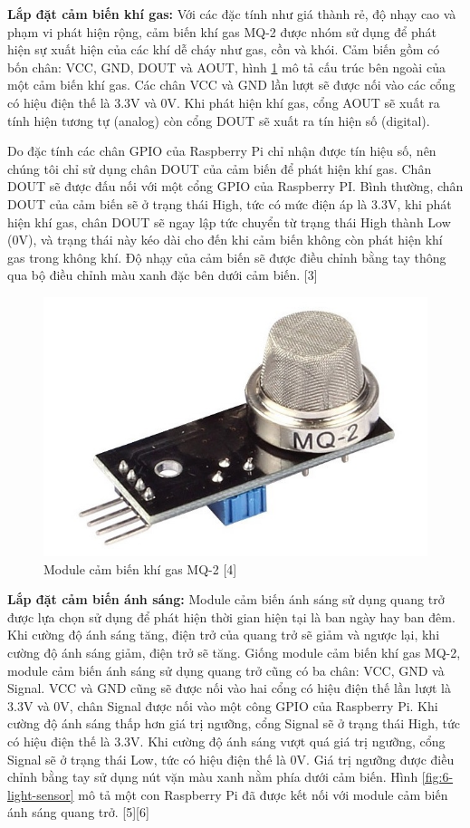 \documentclass[11pt,a4paper,oneside]{book}
\begin{document}
\textbf{Lắp đặt cảm biến khí gas:} Với các đặc tính như giá thành rẻ, độ nhạy cao và phạm vi phát hiện rộng, cảm biến khí gas MQ-2 được nhóm sử dụng để phát hiện sự xuất hiện của các khí dễ cháy như gas, cồn và khói. Cảm biến gồm có bốn chân: VCC, GND, DOUT và AOUT, hình \ref{fig:6-gas-sensor} mô tả cấu trúc bên ngoài của một cảm biến khí gas. Các chân VCC và GND lần lượt sẽ được nối vào các cổng có hiệu điện thế là 3.3V và 0V. Khi phát hiện khí gas, cổng AOUT sẽ xuất ra tính hiện tương tự (analog) còn cổng DOUT sẽ xuất ra tín hiện số (digital).

Do đặc tính các chân GPIO của Raspberry Pi chỉ nhận được tín hiệu số, nên chúng tôi chỉ sử dụng chân DOUT của cảm biến để phát hiện khí gas. Chân DOUT sẽ được đấu nối với một cổng GPIO của Raspberry PI. Bình thường, chân DOUT của cảm biến sẽ ở trạng thái High, tức có mức điện áp là 3.3V, khi phát hiện khí gas, chân DOUT sẽ ngay lập tức chuyển từ trạng thái High thành Low (0V), và trạng thái này kéo dài cho đến khi cảm biến không còn phát hiện khí gas trong không khí. Độ nhạy của cảm biến sẽ được điều chỉnh bằng tay thông qua bộ điều chỉnh màu xanh đặc bên dưới cảm biến. [3]

\begin{figure}[h]
  \centering
     \includegraphics[scale=0.3]{6-gas-sensor}
  \caption{Module cảm biến khí gas MQ-2 [4]}\label{fig:6-gas-sensor}
\end{figure}

\textbf{Lắp đặt cảm biến ánh sáng:} Module cảm biến ánh sáng sử dụng quang trở được lựa chọn sử dụng để phát hiện thời gian hiện tại là ban ngày hay ban đêm. Khi cường độ ánh sáng tăng, điện trở của quang trở sẽ giảm và ngược lại, khi cường độ ánh sáng giảm, điện trở sẽ tăng. Giống module cảm biến khí gas MQ-2, module cảm biến ánh sáng sử dụng quang trở cũng có ba chân: VCC, GND và Signal. VCC và GND cũng sẽ được nối vào hai cổng có hiệu điện thế lần lượt là 3.3V và 0V, chân Signal được nối vào một công GPIO của Raspberry Pi. 
Khi cường độ ánh sáng thấp hơn giá trị ngưỡng, cổng Signal sẽ ở trạng thái High, tức có hiệu điện thế là 3.3V. Khi cường độ ánh sáng vượt quá giá trị ngưỡng, cổng Signal sẽ ở trạng thái Low, tức có hiệu điện thế là 0V. Giá trị ngưỡng được điều chỉnh bằng  tay sử dụng nút vặn màu xanh nằm phía dưới cảm biến. Hình \ref{fig:6-light-sensor} mô tả một con Raspberry Pi đã được kết nối với module cảm biến ánh sáng quang trở. [5][6]
\end{document}
